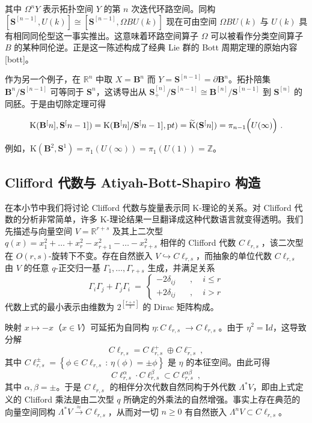 \documentclass[11pt,a4paper]{ctexart}
\newcommand{\SrcRange}[2]{\marginpar{\raggedright\footnotesize 原文 p.#1}}
\begin{document}
其中 \(\Omega^n Y\) 表示拓扑空间 \(Y\) 的第 \(n\) 次迭代环路空间。同构 \([{\mathbf S}^[n-1],U(k)]\cong[{\mathbf S}^[n-1],\Omega BU(k)]\) 现在可由空间 \(\Omega BU(k)\) 与 \(U(k)\) 具有相同同伦型这一事实推出。这意味着环路空间算子 \(\Omega\) 可以被看作分类空间算子 \(B\) 的某种同伦逆。正是这一陈述构成了经典 Lie 群的 Bott 周期定理的原始内容 [bott]。

作为另一个例子，在 \({\mathbb{R}}^n\) 中取 \(X={\mathbf B}^n\) 而 \(Y={\mathbf S}^[n-1]=\partial {\mathbf B}^n\)。拓扑陪集 \({\mathbf B}^n/{\mathbf S}^[n-1]\) 可等同于 \({\mathbf S}^n\)，这诱导出从 \({\mathbf S}^[n]_{+}/{\mathbf S}^[n-1]\cong {\mathbf B}^[n]/{\mathbf S}^[n-1]\) 到 \({\mathbf S}^[n]\) 的同胚。于是由切除定理可得

\[{\mathrm K}({\mathbf B}^[n],{\mathbf S}^[n-1])={\mathrm K}({\mathbf B}^[n]/{\mathbf S}^[n-1],{\mathrm pt})=\widetilde{{\mathrm K}}({\mathbf S}^[n])=\pi_{n-1}\Bigl(U(\infty)\Bigr)\ .\]

例如，\({\mathrm K}({\mathbf B}^{2},{\mathbf S}^{1})=\pi_1(U(\infty))= \pi_1(U(1))= {\mathbb{Z}}\)。

\SrcRange{26}{26}
\subsection{Clifford 代数与 Atiyah-Bott-Shapiro 构造}\label{clifford-ux4ee3ux6570ux4e0e-atiyah-bott-shapiro-ux6784ux9020}

在本小节中我们将讨论 Clifford 代数与旋量表示同 K-理论的关系。对 Clifford 代数的分析非常简单，许多 K-理论结果一旦翻译成这种代数语言就变得透明。我们先描述与向量空间 \(V={\mathbb{R}}^{r+s}\) 及其上二次型 \(q(x)=x_1^{2}+\ldots +x_r^{2}-x_{r+1}^{2}-\ldots -x_{r+s}^{2}\) 相伴的 Clifford 代数 \(C\ell_{r,s}\)，该二次型在 \(O(r,s)\)-旋转下不变。存在自然嵌入 \(V\hookrightarrow C\ell_{r,s}\)，而抽象的单位代数 \(C\ell_{r,s}\) 由 \(V\) 的任意 \(q\)-正交归一基 \(\Gamma_1,\ldots ,\Gamma_{r+s}\) 生成，并满足关系 \[\Gamma_i\Gamma_j+\Gamma_j\Gamma_i~=~\left\{\begin{array}{cll}-2\delta_{ij}~~~~&,
&~~i\leq r\\+2\delta_{ij}~~~~&,&~~i > r\end{array}\right.\] 代数上式的最小表示由维数为 \(2^{\left[\frac{r+s}{2}\right]}\) 的 Dirac 矩阵构成。

映射 \(x\mapsto -x\)（\(x\in V\)）可延拓为自同构 \(\eta: C\ell_{r,s}\rightarrow C\ell_{r,s}\)。由于 \(\eta^2={\mathrm Id}\)，这导致分解 \[C\ell_{r,s}=C\ell_{r,s}^+\oplus C\ell_{r,s}^-\ ,\] 其中 \(C\ell_{r,s}^{\pm}=\left\{\phi\in C\ell_{r,s}\,:\,
\eta(\phi)=\pm\phi\right\}\) 是 \(\eta\) 的本征空间。由此可得 \[C\ell_{r,s}^{\alpha}\cdot C\ell_{r,s}^{\beta}
\subset C\ell_{r,s}^{\alpha\beta}\ ,\] 其中 \(\alpha,\beta=\pm\)。于是 \(C\ell_{r,s}\) 的相伴分次代数自然同构于外代数 \(\Lambda^*V\)，即由上式定义的 Clifford 乘法是由二次型 \(q\) 所确定的外乘法的自然增强。事实上存在典范的向量空间同构 \(\Lambda^*V\stackrel{\approx}{\rightarrow}C\ell_{r,s}\)，从而对一切 \(n\geq 0\) 有自然嵌入 \(\Lambda^nV\subset C\ell_{r,s}\)。
\end{document}
